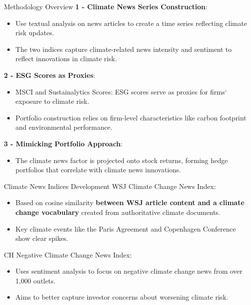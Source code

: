 \documentclass[11pt]{beamer}
\newcommand{\hly}[1]{\colorbox{yellow!100}{#1}}
\begin{document}
\begin{frame}{Methodology Overview}
\textbf{1 - Climate News Series Construction}:

	\begin{itemize}
		\item Use textual analysis on news articles to create a time series reflecting climate risk updates.

		\item The two indices capture climate-related news intensity and sentiment to reflect innovations in climate risk.

	\end{itemize}
\textbf{2 - ESG Scores as Proxies}:

	\begin{itemize}
		\item MSCI and Sustainalytics Scores: ESG scores serve as proxies for firms` exposure to climate risk.

		\item Portfolio construction relies on firm-level characteristics like carbon footprint and environmental performance.

	\end{itemize}
\textbf{3 - Mimicking Portfolio Approach}:

	\begin{itemize}
		\item The climate news factor is projected onto stock returns, forming hedge portfolios that correlate with climate news innovations.
	\end{itemize}
\end{frame}
\begin{frame}{Climate News Indices Development}
WSJ Climate Change News Index:

	\begin{itemize}
		\item Based on \hly{cosine similarity} \textbf{between WSJ article content and a climate change vocabulary} created from authoritative climate documents.

		\item Key climate events like the Paris Agreement and Copenhagen Conference show clear spikes.

	\end{itemize}
CH Negative Climate Change News Index:

	\begin{itemize}
		\item Uses sentiment analysis to focus on negative climate change news from over 1,000 outlets.

		\item Aims to better capture investor concerns about worsening climate risk.
	\end{itemize}
\end{frame}
\end{document}
